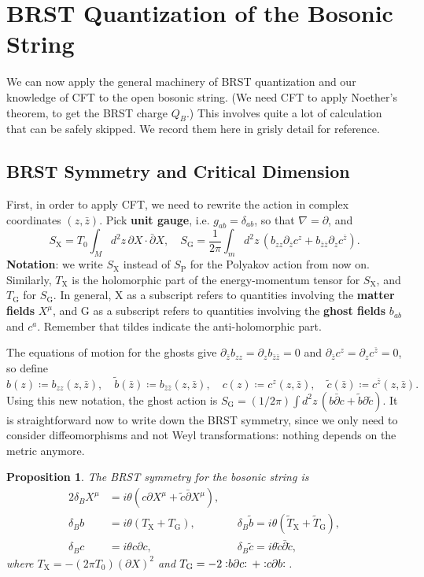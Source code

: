 \documentclass{report}
\theoremstyle{plain}
\newtheorem{proposition}[theorem]{Proposition}
\theoremstyle{definition}
\theoremstyle{remark}
\newcommand{\di}{\partial}
\newcommand{\NO}[1]{\vcentcolon\mathrel{#1}\vcentcolon\,}
\newcommand{\bz}{\bar{z}}
\newcommand{\bdi}{\bar{\di}}
\begin{document}
\section{BRST Quantization of the Bosonic String}

We can now apply the general machinery of BRST quantization and our
knowledge of CFT to the open bosonic string. (We need CFT to apply
Noether's theorem, to get the BRST charge $Q_B$.) This involves quite
a lot of calculation that can be safely skipped. We record them here
in grisly detail for reference.

\subsection{BRST Symmetry and Critical Dimension}

First, in order to apply CFT, we need to rewrite the action in complex
coordinates $(z, \bz)$. Pick {\bf unit gauge}, i.e. $g_{ab} =
\delta_{ab}$, so that $\nabla = \di$, and
\[ S_{\text{X}} = T_0 \int_M d^2z \, \di X \cdot \bar{\di} X, \quad S_{\text{G}} = \frac{1}{2\pi} \int_m d^2z \, \left(b_{zz} \di_{\bz} c^z + b_{\bz\bz} \di_z c^{\bz}\right). \]
{\bf Notation}: we write $S_{\text{X}}$ instead of $S_{\text{P}}$ for
the Polyakov action from now on. Similarly, $T_{\text{X}}$ is the
holomorphic part of the energy-momentum tensor for $S_{\text{X}}$, and
$T_{\text{G}}$ for $S_{\text{G}}$. In general, X as a subscript refers
to quantities involving the {\bf matter fields} $X^\mu$, and G as a
subscript refers to quantities involving the {\bf ghost fields}
$b_{ab}$ and $c^a$. Remember that tildes indicate the anti-holomorphic
part.

The equations of motion for the ghosts give $\di_{\bz} b_{zz} = \di_z
b_{\bz\bz} = 0$ and $\di_{\bz} c^z = \di_z c^{\bz} = 0$, so define
\[ b(z) \coloneqq b_{zz}(z, \bz), \quad \tilde{b}(\bz) \coloneqq b_{\bz\bz}(z, \bz), \quad c(z) \coloneqq c^z(z, \bz), \quad \tilde{c}(\bz) \coloneqq c^{\bz}(z, \bz). \]
Using this new notation, the ghost action is $S_{\text{G}} =
(1/2\pi)\int d^2z \, (b\bdi c + \tilde{b} \di \tilde{c})$. It is
straightforward now to write down the BRST symmetry, since we only
need to consider diffeomorphisms and not Weyl transformations: nothing
depends on the metric anymore.

\begin{proposition}
  The BRST symmetry for the bosonic string is
  \begin{alignat*}{2}
    \delta_B X^\mu &= i\theta (c\di X^\mu + \tilde{c}\bdi X^\mu), \\
    \delta_B b &= i\theta (T_{\text{X}} + T_{\text{G}}), &&\delta_B \tilde{b} = i\theta (\tilde{T}_{\text{X}} + \tilde{T}_{\text{G}}), \\
    \delta_B c &= i\theta c \di c, &&\delta_B \tilde{c} = i\theta \tilde{c} \bdi \tilde{c},
  \end{alignat*}
  where $T_{\text{X}} = -(2\pi T_0)(\di X)^2$ and $T_{\text{G}} = -2 \NO{b \di c} + \NO{c \di b}$.
\end{proposition}
\end{document}

